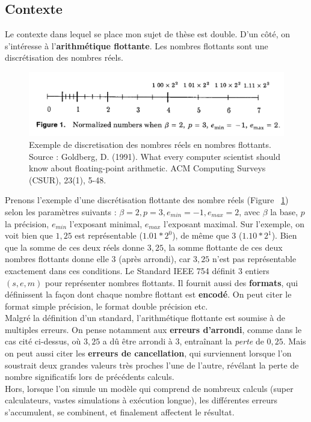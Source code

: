\documentclass[a4paper,11pt]{article}
\begin{document}
\subsection{Contexte}
Le contexte dans lequel se place mon sujet de thèse est double.
D’un côté, on s’intéresse à l’\textbf{arithmétique flottante}. Les nombres flottants sont une discrétisation des nombres réels. 
\begin{figure}[b]
  \begin{center}
    \includegraphics[width=12cm]{Floating_point_numbers_discretization}
    \caption{Exemple de discretisation des nombres réels en nombres flottants. Source : Goldberg, D. (1991). What every computer scientist should know about floating-point arithmetic. ACM Computing Surveys (CSUR), 23(1), 5-48.\cite{goldberg1991every}}
    \label{discretization}
  \end{center}
\end{figure}
Prenons l'exemple d'une discrétisation flottante des nombre réels (Figure ~\ref{discretization}) selon les paramètres suivants : $\beta=2, p=3, e_{min}=-1,e_{max}=2$, avec $\beta$ la base, $p$ la précision, $e_{min}$ l'exposant minimal, $e_{max}$ l'exposant maximal.
Sur l'exemple, on voit bien que $1,25$ est représentable ($1.01*2^{0}$), de même que $3$ ($1.10*2^{1}$). Bien que la somme de ces deux réels donne $3,25$, la somme flottante de ces deux nombres flottants donne elle $3$ (après arrondi), car $3,25$ n'est pas représentable exactement dans ces conditions.
Le Standard IEEE 754\cite{zuras2008ieee} définit 3 entiers $(s,e,m)$ pour représenter nombres flottants. Il fournit aussi des \textbf{formats}, qui définissent la façon dont chaque nombre flottant est \textbf{encodé}. On peut citer le format simple précision, le format double précision etc. \\
Malgré la définition d'un standard, l'arithmétique flottante est soumise à de multiples erreurs. On pense notamment aux \textbf{erreurs d'arrondi}, comme dans le cas cité ci-dessus, où $3,25$ a dû être arrondi à $3$, entraînant la \textit{perte} de $0,25$. Mais on peut aussi citer les \textbf{erreurs de cancellation}, qui surviennent lorsque l'on soustrait deux grandes valeurs très proches l'une de l'autre, révélant la perte de nombre significatifs lors de précédents calculs. \\ %
Hors, lorsque l’on simule un modèle qui comprend de nombreux calculs (super calculateurs, vastes simulations à exécution longue), les différentes erreurs s’accumulent, se combinent, et finalement affectent le résultat.
\end{document}
